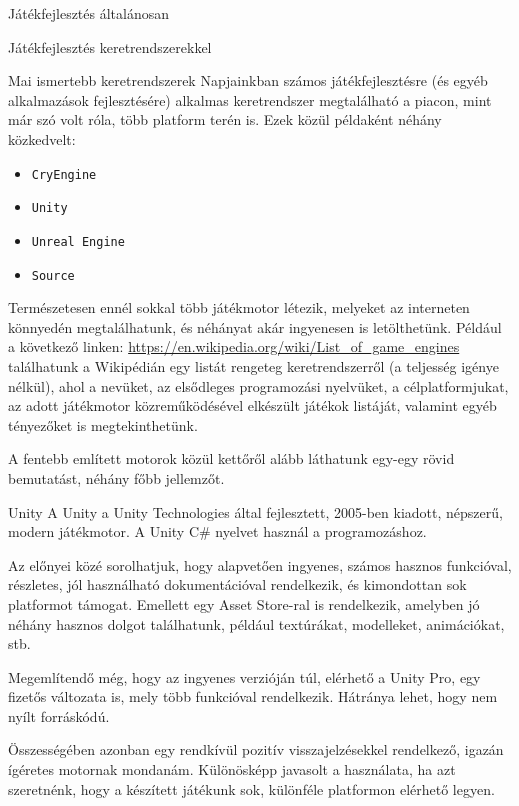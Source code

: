 \begin{MyChapter}{Játékfejlesztés általánosan}
\begin{MySection}{Játékfejlesztés keretrendszerekkel}
		\begin{MySubSection}{Mai ismertebb keretrendszerek}
		Napjainkban számos játékfejlesztésre (és egyéb alkalmazások fejlesztésére) alkalmas keretrendszer megtalálható a piacon, mint már szó volt róla, több platform terén is.
		\newline \newline
		Ezek közül példaként néhány közkedvelt:
		\begin{itemize}
			\item \texttt{CryEngine}
			\item \texttt{Unity}
			\item \texttt{Unreal Engine}
			\item \texttt{Source}
		\end{itemize}
		Természetesen ennél sokkal több játékmotor létezik, melyeket az interneten könnyedén megtalálhatunk, és néhányat akár ingyenesen is letölthetünk.
		Például a következő linken: \url{https://en.wikipedia.org/wiki/List\_of\_game\_engines} találhatunk a Wikipédián egy listát rengeteg keretrendszerről (a teljesség igénye nélkül), ahol a nevüket, az elsődleges programozási nyelvüket, a célplatformjukat, az adott játékmotor közreműködésével elkészült játékok listáját, valamint egyéb tényezőket is megtekinthetünk.
		
		A fentebb említett motorok közül kettőről alább láthatunk egy-egy rövid bemutatást, néhány főbb jellemzőt.
		\end{MySubSection}
	
		\begin{MySubSection}{Unity}
			A Unity a Unity Technologies által fejlesztett, 2005-ben kiadott, népszerű, modern játékmotor. A Unity C\# nyelvet használ a programozáshoz.
			
			Az előnyei közé sorolhatjuk, hogy alapvetően ingyenes, számos hasznos funkcióval, részletes, jól használható dokumentációval rendelkezik, és kimondottan sok platformot támogat. Emellett egy Asset Store-ral is rendelkezik, amelyben jó néhány hasznos dolgot találhatunk, például textúrákat, modelleket, animációkat, stb.
			
			Megemlítendő még, hogy az ingyenes verzióján túl, elérhető a Unity Pro, egy fizetős változata is, mely több funkcióval rendelkezik.
			Hátránya lehet, hogy nem nyílt forráskódú.
			
			Összességében azonban egy rendkívül pozitív visszajelzésekkel rendelkező, igazán ígéretes motornak mondanám. Különösképp javasolt a használata, ha azt szeretnénk, hogy a készített játékunk sok, különféle platformon elérhető legyen.
			\cite{unity_vs_unreal}
			\cite{unity_official_website}


\end{MySubSection}
\end{MySection}
\end{MyChapter}
